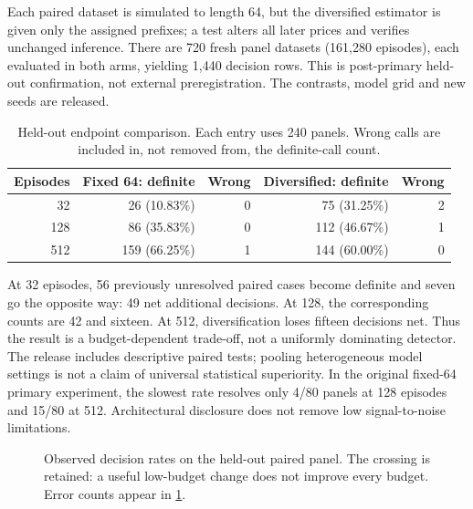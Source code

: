 \documentclass[10pt,twocolumn,letterpaper]{article}
\theoremstyle{definition}
\theoremstyle{remark}
\begin{document}
Each paired dataset is simulated to length 64, but the diversified estimator is given only the assigned prefixes; a test alters all later prices and verifies unchanged inference. There are 720 fresh panel datasets (161,280 episodes), each evaluated in both arms, yielding 1,440 decision rows. This is post-primary held-out confirmation, not external preregistration. The contrasts, model grid and new seeds are released.

\begin{table}[htbp]
\centering\small
\caption{Held-out endpoint comparison. Each entry uses 240 panels. Wrong calls are included in, not removed from, the definite-call count.}
\label{tab:endpoint_results}
\begin{tabular}{r r r r r}
\toprule
Episodes & Fixed 64: definite & Wrong & Diversified: definite & Wrong\\
\midrule
32 & 26 (10.83\%) & 0 & 75 (31.25\%) & 2\\
128 & 86 (35.83\%) & 0 & 112 (46.67\%) & 1\\
512 & 159 (66.25\%) & 1 & 144 (60.00\%) & 0\\
\bottomrule
\end{tabular}
\end{table}

At 32 episodes, 56 previously unresolved paired cases become definite and seven go the opposite way: 49 net additional decisions. At 128, the corresponding counts are 42 and sixteen. At 512, diversification loses fifteen decisions net. Thus the result is a budget-dependent trade-off, not a uniformly dominating detector. The release includes descriptive paired tests; pooling heterogeneous model settings is not a claim of universal statistical superiority. In the original fixed-64 primary experiment, the slowest rate resolves only 4/80 panels at 128 episodes and 15/80 at 512. Architectural disclosure does not remove low signal-to-noise limitations.

\begin{figure}[htbp]
\centering
{}
\caption{Observed decision rates on the held-out paired panel. The crossing is retained: a useful low-budget change does not improve every budget. Error counts appear in \cref{tab:endpoint_results}.}
\label{fig:endpoint_tradeoff}
\end{figure}
\end{document}
